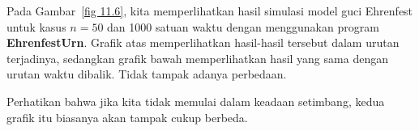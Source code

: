 \begin{example}

\par
Pada Gambar~\ref{fig 11.6}, kita memperlihatkan hasil simulasi model guci
Ehrenfest untuk kasus $n = 50$ dan 1000 satuan waktu dengan menggunakan program
{\bf EhrenfestUrn}. Grafik atas memperlihatkan
hasil-hasil tersebut dalam urutan terjadinya, sedangkan grafik bawah
memperlihatkan hasil yang sama dengan urutan waktu dibalik. Tidak tampak adanya
perbedaan.
\par
Perhatikan bahwa jika kita tidak memulai dalam keadaan setimbang, kedua grafik
itu biasanya akan tampak cukup berbeda.
\end{example}

